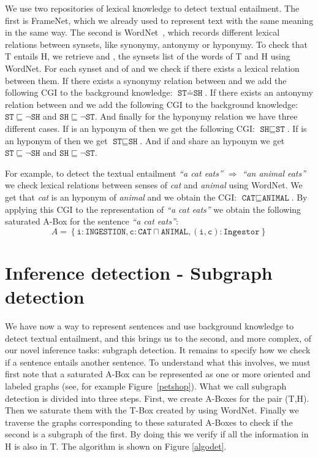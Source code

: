 \documentclass{esslli}
\newcommand{\dl}[1]{\texttt{#1}}
\newcommand{\dd}{{:}}
\begin{document}
We use two repositories of lexical knowledge to detect textual
entailment. The first is FrameNet, which we already used to represent
text with the same meaning in the same way. The second is
WordNet~\cite{lin98wordnet}, which records different lexical relations
between synsets, like synonymy, antonymy or hyponymy. To check that T
entails H, we retrieve  and , the synsets list of the
words of T and H using WordNet. For each synset  and  of
 and  we check if there exists a lexical relation
between them. If there exists a synonymy relation between  and
 we add the following CGI to the background knowledge: $\dl{ST}
\doteq \dl{SH}$. If there exists an antonymy relation between 
and  we add the following CGI to the background knowledge:
$\dl{ST} \sqsubseteq \neg \dl{SH}$ and $\dl{SH} \sqsubseteq \neg
\dl{ST}$. And finally for the hyponymy relation we have three
different cases. If  is an hyponym of  then we get the
following CGI: $\dl{SH} \sqsubseteq \dl{ST}$. If  is an
hyponym of  then we get $\dl{ST} \sqsubseteq \dl{SH}$. And
if  and  share an hyponym we get $\dl{ST} \sqsubseteq
\neg \dl{SH}$ and $\dl{SH} \sqsubseteq \neg \dl{ST}$.


For example, to detect the textual entailment \emph{``a cat eats''
  $\Rightarrow$ ``an animal eats''} we check lexical relations between
  senses of \emph{cat} and \emph{animal} using WordNet. We get that
  \emph{cat} is an hyponym of \emph{animal} and we obtain the CGI:
  $\dl{CAT} \sqsubseteq \dl{ANIMAL}$. By applying this CGI to the
  representation of \emph{``a cat eats''} we obtain the following
  saturated A-Box for the sentence \emph{``a cat eats''}:
$$A = \left\{
\dl{i} \dd \dl{INGESTION},  \dl{c} \dd \dl{CAT} \sqcap \dl{ANIMAL}, (\dl{i},\dl{c}) \dd \dl{Ingestor}
\right\}$$

\section{Inference detection - Subgraph detection}

We have now a way to represent sentences and use background knowledge
to detect textual entailment, and this brings us to the second, and
more complex, of our novel inference tasks: subgraph detection. It
remains to specify how we check if a sentence entails another
sentence. To understand what this involves, we must first note that a
saturated A-Box can be represented as one or more oriented and labeled
graphs (see, for example Figure~\ref{petshop}). What we call subgraph
detection is divided into three steps. First, we create A-Boxes for
the pair (T,H). Then we saturate them with the T-Box created by using
WordNet. Finally we traverse the graphs corresponding to these
saturated A-Boxes to check if the second is a subgraph of the
first. By doing this we verify if all the information in H is also in
T. The algorithm is shown on Figure \ref{algodet}.
\end{document}
